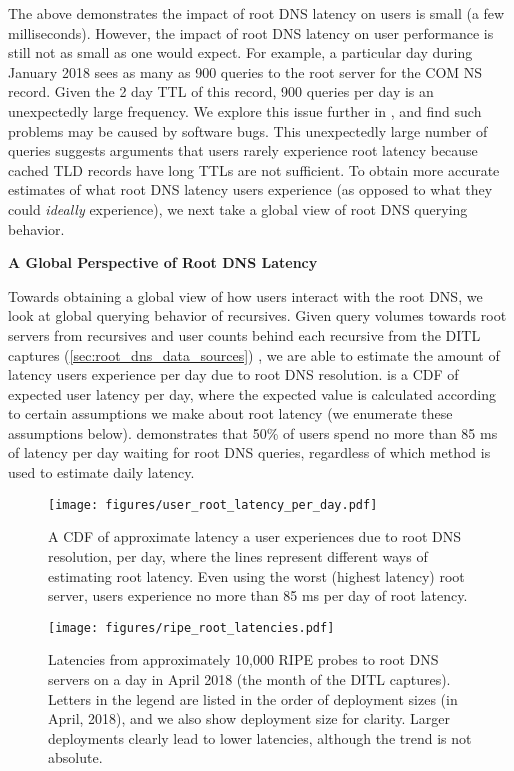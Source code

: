\documentclass[sigconf,letterpaper,nonacm,10pt,anonymous]{acmart}
\begin{document}
The above demonstrates the impact of root DNS latency on users is small
(a few milliseconds). However, the impact of root DNS latency on user
performance is still not as small as one would expect. For example, a
particular day during January 2018 sees as many as 900 queries to the
root server for the COM NS record. Given the 2 day TTL of this record,
900 queries per day is an unexpectedly large frequency. We explore this
issue further in , and find such problems may
be caused by software bugs. This unexpectedly large number of queries
suggests arguments that users rarely experience root latency because
cached TLD records have long TTLs are not sufficient. To obtain more
accurate estimates of what root DNS latency users experience (as opposed
to what they could \emph{ideally} experience), we next take a global
view of root DNS querying behavior.

\textbf{A Global Perspective of Root DNS Latency}

Towards obtaining a global view of how users interact with the root DNS,
we look at global querying behavior of recursives. Given query volumes
towards root servers from recursives and user counts behind each
recursive from the DITL captures (\cref{sec:root_dns_data_sources}) , we
are able to estimate the amount of latency users experience per day due
to root DNS resolution.  is a CDF of
expected user latency per day, where the expected value is calculated
according to certain assumptions we make about root latency (we
enumerate these assumptions below). 
demonstrates that 50\% of users spend no more than 85 ms of latency per
day waiting for root DNS queries, regardless of which method is used to
estimate daily latency.

\begin{figure}
    \centering
    \texttt{[image: figures/user\_root\_latency\_per\_day.pdf]}
    \caption{A CDF of approximate latency a user experiences due to root DNS resolution, per day, where the lines represent different ways of estimating root latency. Even using the worst (highest latency) root server, users experience no more than 85 ms per day of root latency.}
    \label{fig:user_root_latency_per_day}
\end{figure}

\begin{figure}
    \centering
    \texttt{[image: figures/ripe\_root\_latencies.pdf]}
    \caption{Latencies from approximately 10,000 RIPE probes to root DNS servers on a day in April 2018 (the month of the DITL captures). Letters in the legend are listed in the order of deployment sizes (in April, 2018), and we also show deployment size for clarity. Larger deployments clearly lead to lower latencies, although the trend is not absolute.}
    \label{fig:ripe_root_latencies}
\end{figure}
\end{document}
